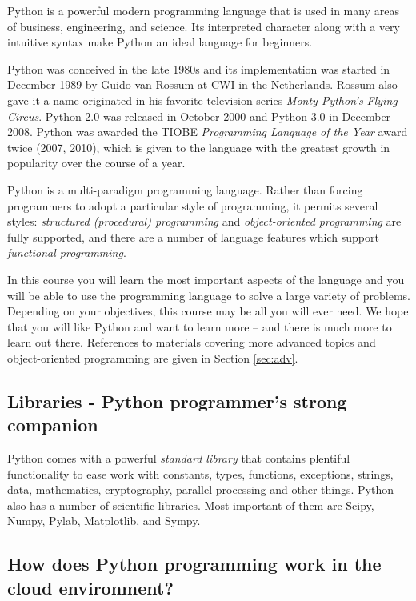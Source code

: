 Python is a powerful modern programming language that is used in many areas of business, 
engineering, and science. Its interpreted character along with a very intuitive syntax make Python an 
ideal language for beginners. 

Python was conceived in the late 1980s and its implementation was started in December 1989
by Guido van Rossum at CWI in the Netherlands. Rossum also gave it a name originated
in his favorite television series {\em Monty Python's Flying Circus}.
Python 2.0 was released in October 2000 and Python 3.0 in December 2008. Python was
awarded the TIOBE {\em Programming Language of the Year} award twice (2007, 2010), which is 
given to the language with the greatest growth in popularity over the course of a year.

Python is a multi-paradigm programming language. Rather than forcing programmers to 
adopt a particular style of programming, it permits several styles: {\em structured (procedural) 
programming} and {\em object-oriented programming} are fully supported, and there are a number 
of language features which support {\em functional programming}. 

In this course you will 
learn the most important aspects of the language and you will be able to 
use the programming language to solve a large variety of problems. 
Depending on your objectives, this course may be all you will ever need. 
We hope that you will like Python and want to learn more -- and there is much 
more to learn out there. References to materials covering more advanced topics 
and object-oriented programming are given in Section \ref{sec:adv}.

\subsection{Libraries - Python programmer's strong companion}

Python comes with a powerful {\em standard library} that contains plentiful functionality
to ease work with constants, types, functions, exceptions, strings, data, 
mathematics, cryptography, parallel processing and other things. 
Python also has a number of scientific libraries. Most important of them are Scipy, 
Numpy, Pylab, Matplotlib, and Sympy.

\subsection{How does Python programming work in the cloud environment?}

